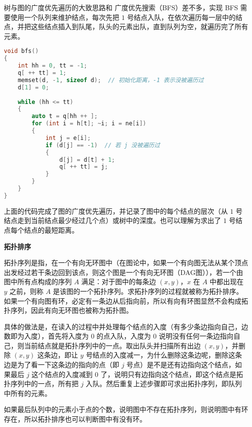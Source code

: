 

树与图的广度优先遍历的大致思路和 广度优先搜索（BFS）差不多，实现 BFS 需要使用一个队列来维护结点，每次先把 $1$ 号结点入队，在依次遍历每一层中的结点，并把这些结点插入到队尾，队头的元素出队，直到队列为空，就遍历完了所有元素。

\begin{lstlisting}[language=cpp]
void bfs()
{
    int hh = 0, tt = -1;
    q[ ++ tt] = 1;
    memset(d, -1, sizeof d);  // 初始化距离，-1 表示没被遍历过
    d[1] = 0;
    
    while (hh <= tt)
    {
        auto t = q[hh ++ ];
        for (int i = h[t]; ~i; i = ne[i])
        {
            int j = e[i];
            if (d[j] == -1)  // 若 j 没被遍历过
            {
                d[j] = d[t] + 1;
                q[ ++ tt] = j;
            }
        }
    }
}
\end{lstlisting}

上面的代码完成了图的广度优先遍历，并记录了图中的每个结点的层次（从 $1$ 号结点走到当前结点最少经过几个点）或树中的深度。也可以理解为求出了 $1$ 号结点每个结点的最短距离。

\textbf{拓扑排序}

拓扑序列是指，在一个有向无环图中（在图论中，如果一个有向图无法从某个顶点出发经过若干条边回到该点，则这个图是一个有向无环图（DAG图）），若一个由图中所有点构成的序列 $A$ 满足：对于图中的每条边 $(x, y)$，$x$ 在 $A$ 中都出现在 $y$ 之前，则称 $A$ 是该图的一个拓扑序列。求拓扑序列的过程就被称为拓扑排序。如果一个有向图有环，必定有一条边从后指向前，所以有向有环图显然不会构成拓扑序列，因此有向无环图也被称为拓扑图。

具体的做法是，在读入的过程中并处理每个结点的入度（有多少条边指向自己，边数即为入度），首先将入度为 $0$ 的点入队，入度为 $0$ 说明没有任何一条边指向自己，则当前结点就是拓扑序列中的一点。取出队头并扫描所有出边 $(x, y)$，并删除 $(x, y)$ 这条边，即让 $y$ 号结点的入度减一，为什么删除这条边呢，删除这条边是为了看一下这条边的指向的点（即 $j$ 号点）是不是还有边指向这个结点，如果最后 $j$ 这个结点的入度减到 $0$ 了，说明只有边指向这个结点，即这个结点是拓扑序列中的一点，所有把 $j$ 入队。然后重复上述步骤即可求出拓扑序列，即队列中所有的元素。

如果最后队列中的元素小于点的个数，说明图中不存在拓扑序列，则说明图中有环存在，所以拓扑排序也可以判断图中有没有环。

